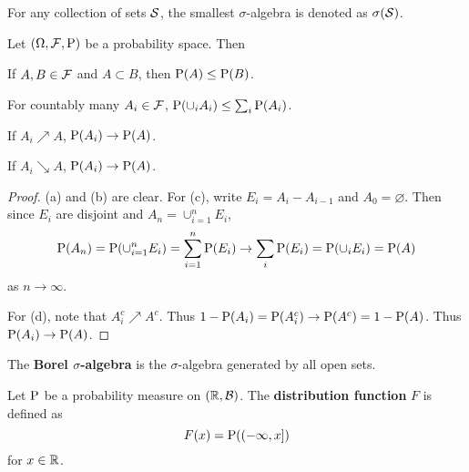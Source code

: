\begin{definition}
    For any collection of sets $\S$, the smallest $\sigma$-algebra is denoted 
    as $\sigma(\S)$. 
\end{definition}

\begin{theorem}
    Let $(\Omega, \F, \P)$ be a probability space. Then 
    \begin{thmenum}
        \item If $A, B\in\F$ and $A\subset B$, then $\P(A)\leq\P(B)$. 
        \item For countably many $A_i\in\F$, $\P(\cup_i A_i)\leq \sum_i \P(A_i)$. 
        \item If $A_i\nearrow A$, $\P(A_i)\to \P(A)$. 
        \item If $A_i\searrow A$, $\P(A_i)\to \P(A)$. 
    \end{thmenum}
\end{theorem}
\begin{proof}
    (a) and (b) are clear. For (c), write $E_i = A_i - A_{i-1}$ and $A_0 = \varnothing$. 
    Then since $E_i$ are disjoint and $A_n = \cup_{i=1}^n E_i$, 
    \begin{equation*}
        \P(A_n) = \P\pth{\cup_{i=1}^n E_i} = \sum_{i=1}^n \P(E_i) 
        \to \sum_i \P(E_i) = \P(\cup_i E_i) = \P(A)
    \end{equation*}  
    as $n\to\infty$. 
    
    For (d), note that $A_i^c\nearrow A^c$. Thus $1 - \P(A_i) = \P(A_i^c)\to\P(A^c) = 1 - \P(A)$. 
    Thus $\P(A_i)\to\P(A)$.  
\end{proof}

\begin{definition}
    The \textbf{Borel $\sigma$-algebra} is the $\sigma$-algebra generated by all 
    open sets. 
\end{definition}

\begin{definition}
    Let $\P$ be a probability measure on $(\R, \B)$. The \textbf{distribution function} 
    $F$ is defined as 
    \begin{equation*}
        F(x) = \P((-\infty, x])
    \end{equation*}
    for $x\in\R$. 
\end{definition}

